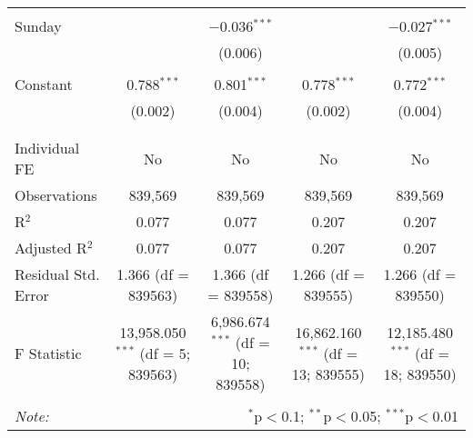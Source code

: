 \documentclass[
]{article}
\begin{document}
\begin{table}[!htbp]
{\begin{tabular}{@{\extracolsep{5pt}}lcccc}
  & & & & \\ 
 Sunday &  & $-$0.036$^{***}$ &  & $-$0.027$^{***}$ \\ 
  &  & (0.006) &  & (0.005) \\ 
  & & & & \\ 
 Constant & 0.788$^{***}$ & 0.801$^{***}$ & 0.778$^{***}$ & 0.772$^{***}$ \\ 
  & (0.002) & (0.004) & (0.002) & (0.004) \\ 
  & & & & \\ 
\hline \\[-1.8ex] 
Individual FE & No & No & No & No \\ 
Observations & 839,569 & 839,569 & 839,569 & 839,569 \\ 
R$^{2}$ & 0.077 & 0.077 & 0.207 & 0.207 \\ 
Adjusted R$^{2}$ & 0.077 & 0.077 & 0.207 & 0.207 \\ 
Residual Std. Error & 1.366 (df = 839563) & 1.366 (df = 839558) & 1.266 (df = 839555) & 1.266 (df = 839550) \\ 
F Statistic & 13,958.050$^{***}$ (df = 5; 839563) & 6,986.674$^{***}$ (df = 10; 839558) & 16,862.160$^{***}$ (df = 13; 839555) & 12,185.480$^{***}$ (df = 18; 839550) \\ 
\hline 
\hline \\[-1.8ex] 
\textit{Note:}  & \multicolumn{4}{r}{$^{*}$p$<$0.1; $^{**}$p$<$0.05; $^{***}$p$<$0.01} \\ 
\end{tabular}
} 
\end{table} 
\newpage
\end{document}
